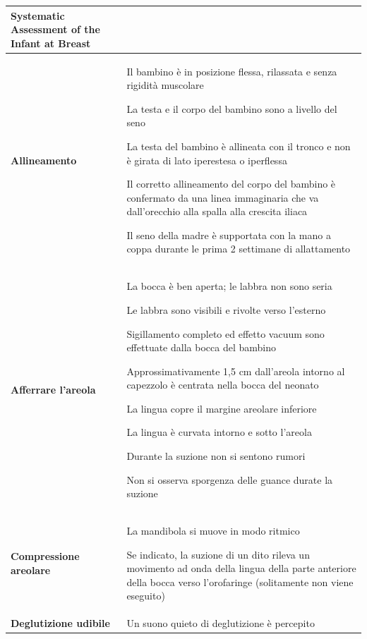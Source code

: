 \documentclass[]{article}
\begin{document}
\begin{longtable}[]{@{}ll@{}}
\toprule
\textbf{Systematic Assessment of the Infant at Breast } &\tabularnewline
\midrule
\endhead
\begin{minipage}[t]{0.47\columnwidth}\raggedright
\textbf{Allineamento }\strut
\end{minipage} & \begin{minipage}[t]{0.47\columnwidth}\raggedright
Il bambino è in posizione flessa, rilassata e senza rigidità muscolare

La testa e il corpo del bambino sono a livello del seno

La testa del bambino è allineata con il tronco e non è girata di lato
iperestesa o iperflessa

Il corretto allineamento del corpo del bambino è confermato da una linea
immaginaria che va dall'orecchio alla spalla alla crescita iliaca

Il seno della madre è supportata con la mano a coppa durante le prima 2
settimane di allattamento\strut
\end{minipage}\tabularnewline
\begin{minipage}[t]{0.47\columnwidth}\raggedright
\textbf{Afferrare l'areola}\strut
\end{minipage} & \begin{minipage}[t]{0.47\columnwidth}\raggedright
La bocca è ben aperta; le labbra non sono seria

Le labbra sono visibili e rivolte verso l'esterno

Sigillamento completo ed effetto vacuum sono effettuate dalla bocca del
bambino

Approssimativamente 1,5 cm dall'areola intorno al capezzolo è centrata
nella bocca del neonato

La lingua copre il margine areolare inferiore

La lingua è curvata intorno e sotto l'areola

Durante la suzione non si sentono rumori

Non si osserva sporgenza delle guance durate la suzione\strut
\end{minipage}\tabularnewline
\begin{minipage}[t]{0.47\columnwidth}\raggedright
\textbf{Compressione areolare}\strut
\end{minipage} & \begin{minipage}[t]{0.47\columnwidth}\raggedright
La mandibola si muove in modo ritmico

Se indicato, la suzione di un dito rileva un movimento ad onda della
lingua della parte anteriore della bocca verso l'orofaringe (solitamente
non viene eseguito)\strut
\end{minipage}\tabularnewline
\begin{minipage}[t]{0.47\columnwidth}\raggedright
\textbf{Deglutizione udibile}\strut
\end{minipage} & \begin{minipage}[t]{0.47\columnwidth}\raggedright
Un suono quieto di deglutizione è percepito


\end{minipage}
\end{longtable}
\end{document}

